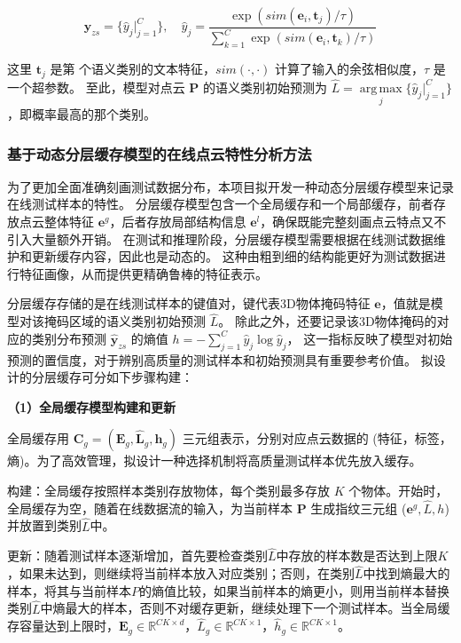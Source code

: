 \documentclass[12pt]{article}
\newcommand{\myEmph}[1]{\textbf{\textcolor[rgb]{0,0,0.25}{#1}}}
\DeclareMathOperator*{\argmax}{arg\,max}  %
\begin{document}
\begin{equation}
    \hat{\textbf{y}}_{zs} = \{\hat{y}_j|_{j=1}^C\}, \quad \hat{y}_j = \frac{\exp(sim(\textbf{e}_i, \textbf{t}_j) / \tau)}{\sum_{k=1}^{C}\exp(sim(\textbf{e}_i, \textbf{t}_{k}) / \tau)}
    \label{eq:zero_shot_pred}
\end{equation}

这里 $\textbf{t}_j$ 是第 个语义类别的文本特征，$sim(\cdot,\cdot)$ 计算了输入的余弦相似度，$\tau$ 是一个超参数。
至此，模型对点云 $\boldsymbol{P}$ 的语义类别初始预测为 $\hat{L} = \argmax\limits_{j} \{\hat{y}_j|_{j=1}^C\}$，即概率最高的那个类别。

\subsubsection{基于动态分层缓存模型的在线点云特性分析方法}

为了更加全面准确刻画测试数据分布，本项目拟开发一种动态分层缓存模型来记录在线测试样本的特性。
分层缓存模型包含一个全局缓存和一个局部缓存，前者存放点云整体特征 $\textbf{e}^g$，后者存放局部结构信息 $\textbf{e}^l$，确保既能完整刻画点云特点又不引入大量额外开销。
在测试和推理阶段，分层缓存模型需要根据在线测试数据维护和更新缓存内容，因此也是动态的。
这种由粗到细的结构能更好为测试数据进行特征画像，从而提供更精确鲁棒的特征表示。

分层缓存存储的是在线测试样本的键值对，键代表3D物体掩码特征 $\boldsymbol{e}$，值就是模型对该掩码区域的语义类别初始预测 $\hat{L}$。
除此之外，还要记录该3D物体掩码的对应的类别分布预测 $\hat{\textbf{y}}_{zs}$ 的熵值 $h = -\sum_{j=1}^{C} \hat{y}_j \log \hat{y}_j$，
这一指标反映了模型对初始预测的置信度，对于辨别高质量的测试样本和初始预测具有重要参考价值。
拟设计的分层缓存可分如下步骤构建：

\myEmph{（1）全局缓存模型构建和更新}

全局缓存用 $\textbf{C}_g = (\textbf{E}_g, \hat{\textbf{L}}_g, \textbf{h}_g)$ 三元组表示，分别对应点云数据的 (特征，标签，熵)。为了高效管理，拟设计一种选择机制将高质量测试样本优先放入缓存。

构建：全局缓存按照样本类别存放物体，每个类别最多存放 $K$ 个物体。开始时，全局缓存为空，随着在线数据流的输入，为当前样本 $\boldsymbol{P}$ 生成指纹三元组 ($\textbf{e}^g, \hat{L}, h$)并放置到类别$\hat{L}$中。

更新：随着测试样本逐渐增加，首先要检查类别$\hat{L}$中存放的样本数是否达到上限$K$，如果未达到，则继续将当前样本放入对应类别；否则，在类别$\hat{L}$中找到熵最大的样本，将其与当前样本$P$的熵值比较，如果当前样本的熵更小，则用当前样本替换类别$\hat{L}$中熵最大的样本，否则不对缓存更新，继续处理下一个测试样本。当全局缓存容量达到上限时，$\textbf{E}_g \in \mathbb{R}^{CK\times d}$，$\hat{L}_g \in \mathbb{R}^{CK \times 1}$，$\hat{h}_g \in \mathbb{R}^{CK \times 1}$。
\end{document}
